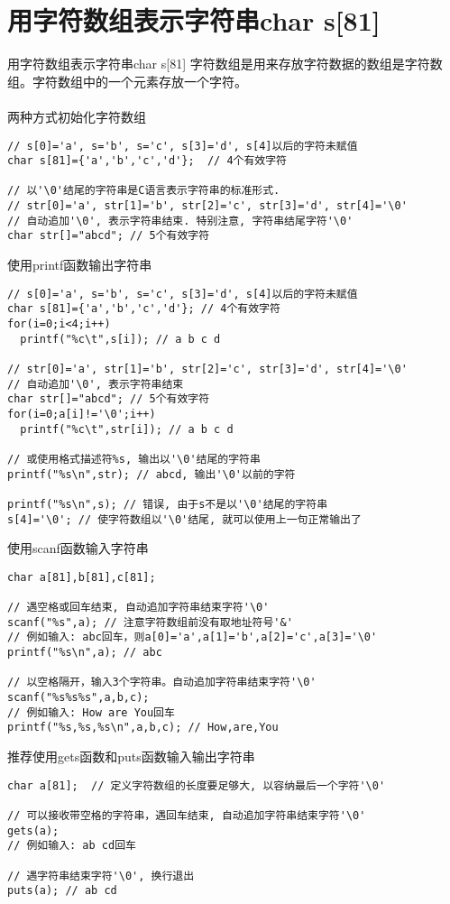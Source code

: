 \section{用字符数组表示字符串char s[81]}

\begin{frame}{用字符数组表示字符串char s[81]}
字符数组是用来存放字符数据的数组是字符数组。字符数组中的一个元素存放一个字符。\\
~\\
两种方式初始化字符数组
\begin{lstlisting}
// s[0]='a', s='b', s='c', s[3]='d', s[4]以后的字符未赋值
char s[81]={'a','b','c','d'};  // 4个有效字符

// 以'\0'结尾的字符串是C语言表示字符串的标准形式. 
// str[0]='a', str[1]='b', str[2]='c', str[3]='d', str[4]='\0'
// 自动追加'\0', 表示字符串结束. 特别注意, 字符串结尾字符'\0'
char str[]="abcd"; // 5个有效字符
\end{lstlisting}
\end{frame}

\begin{frame}{使用printf函数输出字符串}
\vspace{-0.3cm}
\begin{lstlisting}
// s[0]='a', s='b', s='c', s[3]='d', s[4]以后的字符未赋值
char s[81]={'a','b','c','d'}; // 4个有效字符
for(i=0;i<4;i++)
  printf("%c\t",s[i]); // a b c d

// str[0]='a', str[1]='b', str[2]='c', str[3]='d', str[4]='\0'
// 自动追加'\0', 表示字符串结束
char str[]="abcd"; // 5个有效字符
for(i=0;a[i]!='\0';i++)
  printf("%c\t",str[i]); // a b c d

// 或使用格式描述符%s, 输出以'\0'结尾的字符串
printf("%s\n",str); // abcd, 输出'\0'以前的字符

printf("%s\n",s); // 错误, 由于s不是以'\0'结尾的字符串
s[4]='\0'; // 使字符数组以'\0'结尾, 就可以使用上一句正常输出了
\end{lstlisting}
\end{frame}

\begin{frame}{使用scanf函数输入字符串}
\begin{lstlisting}
char a[81],b[81],c[81];

// 遇空格或回车结束, 自动追加字符串结束字符'\0'
scanf("%s",a); // 注意字符数组前没有取地址符号'&'
// 例如输入: abc回车，则a[0]='a',a[1]='b',a[2]='c',a[3]='\0'
printf("%s\n",a); // abc

// 以空格隔开，输入3个字符串。自动追加字符串结束字符'\0'
scanf("%s%s%s",a,b,c); 
// 例如输入: How are You回车
printf("%s,%s,%s\n",a,b,c); // How,are,You
\end{lstlisting}
\end{frame}

\begin{frame}{推荐使用gets函数和puts函数输入输出字符串}
\begin{lstlisting}
char a[81];  // 定义字符数组的长度要足够大, 以容纳最后一个字符'\0'

// 可以接收带空格的字符串，遇回车结束, 自动追加字符串结束字符'\0'
gets(a);
// 例如输入: ab cd回车

// 遇字符串结束字符'\0', 换行退出
puts(a); // ab cd
\end{lstlisting}
\end{frame}





